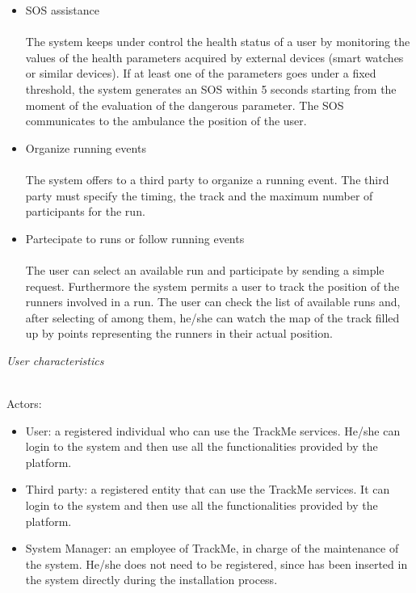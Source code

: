 \documentclass{article}
\begin{document}
\begin{legal}
\begin{legal}
{\begin{itemize}
		\item SOS assistance\\\\
		The system keeps under control the health status of a user by monitoring the values of the health parameters acquired by external devices (smart watches or similar devices). If at least one of the parameters goes under a fixed threshold, the system generates an SOS within 5 seconds starting from the moment of the evaluation of the dangerous parameter. The SOS communicates to the ambulance the position of the user.\\
		\item Organize running events\\\\
		The system offers to a third party to organize a running event. The third party must specify the timing, the track and the maximum number of participants for the run.\\
		\item Partecipate to runs or follow running events\\\\
		The user can select an available run and participate by sending a simple request. Furthermore the system permits a user to track the position of the runners involved in a run. The user can check the list of available runs and, after selecting of among them, he/she can watch the map of the track filled up by points representing the runners in their actual position. \\
		\end{itemize}
		}
		\item \textit{User characteristics} \\\\
			{\normalfont
			Actors:\\
			\begin{itemize}
			 \item User: a registered individual who can use the TrackMe services. He/she can login to the system and then use all the functionalities provided by the platform.\\
			\item Third party: a registered entity that can use the TrackMe services. It can login to the system and then use all the functionalities provided by the platform.\\
 			\item System Manager:  an employee of TrackMe, in charge of the maintenance of the system. He/she does not need to be registered, since has been inserted in the system directly during the installation process.\\

\end{itemize}}
\end{legal}
\end{legal}
\end{document}
